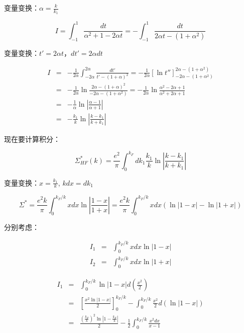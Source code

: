 变量变换：$\alpha = \frac{k }{k_1 }$

\begin{equation*}
I = \int_{-1}^1 \frac{dt}{\alpha^2 + 1 - 2 \alpha t  } = - \int_{-1}^1 \frac{d t }{2 \alpha t - (1 + \alpha^2 )  }
\end{equation*}

变量变换：$ t' = 2 \alpha t $，$d t' = 2 \alpha d t$

\begin{eqnarray*}
I &=& - \frac{1}{2 \alpha} \int_{ - 2 \alpha}^{ 2 \alpha }  \frac{ dt' }{ t' - (1 + \alpha)^2  } = - \frac{1}{2 \alpha} \left[ \ln  t'' \right]_{ - 2 \alpha - ( 1 + \alpha^2 )}^{ 2 \alpha - (1 + \alpha^2) } \\
{} & = & - \frac{1}{2 \alpha} \ln \frac{ 2 \alpha - (1 + \alpha)^2 }{ - 2 \alpha - (1 + \alpha^2 )  } = - \frac{1}{2 \alpha} \ln \frac{ \alpha^2 - 2 \alpha +1 }{ \alpha^2 + 2 \alpha +1 } \\
{} &=& - \frac{1}{\alpha} \ln \left| \frac{\alpha -1}{\alpha +1 }  \right| \\
{} &=& - \frac{k_1}{k} \ln \left| \frac{k - k_1}{ k + k_1 }  \right|
\end{eqnarray*}

现在要计算积分：

\begin{equation*}
\Sigma^*_{HF}(k ) = \frac{e^2 }{\pi}  \int_0^{k_F}  d k_1 \frac{k_1}{k} \ln \left|  \frac{ k - k_1 }{ k + k_1 } \right| 
\end{equation*}

变量变换：$ x = \frac{k_1}{ k } $, $k d x = d k_1$


\begin{equation*}
\Sigma^* = \frac{e^2 k}{\pi} \int_0^{k_F / k} x dx \ln \left| \frac{1-x}{1+x}  \right| = \frac{e^2 k}{\pi} \int_0^{k_F / k} x dx \left( \ln |1-x| - \ln |1+x|  \right)
\end{equation*}

分别考虑：

\begin{eqnarray*}
I_1 & = & \int_0^{k_F / k} x d x \ln | 1 - x |  \\
I_2 & = & \int_0^{k_F / k} x dx \ln | 1 + x |
\end{eqnarray*}

\begin{eqnarray*}
I_1 &=& \int_0^{k_F / k} \ln | 1- x | d\left( \frac{x^2}{2} \right) \\
{}&=& \left[ \frac{ x^2 \ln |1 -x| }{2} \right]_0^{k_F / k} - \int_0^{k_F / k}  \frac{x^2}{2} d \left( \ln | 1- x  | \right) \\
{} & = &  \frac{  \left( \frac{k_F}{k} \right)^2 \ln \left| 1 - \frac{ k_F }{ k } \right| }{2} - \frac{1}{2} \int_0^{k_F / k} \frac{x^2 d x}{x-1}
\end{eqnarray*}


